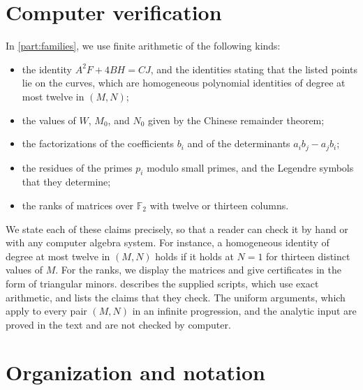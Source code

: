 \documentclass[12pt,oneside,openany]{book}
\theoremstyle{definition}
\theoremstyle{plain}
\numberwithin{equation}{chapter}
\theoremstyle{plain}
\theoremstyle{definition}
\theoremstyle{remark}
\newcommand{\F}{\mathbb F}
\begin{document}
\section{Computer verification}\label{sec:intro-verification}

In \cref{part:families}, we use finite arithmetic of the following kinds:
\begin{itemize}
\item the identity $A^2F+4BH=CJ$, and the identities stating that the listed points lie on the curves, which are homogeneous polynomial identities of degree at most twelve in $(M,N)$;
\item the values of $W$, $M_0$, and $N_0$ given by the Chinese remainder theorem;
\item the factorizations of the coefficients $b_i$ and of the determinants $a_ib_j-a_jb_i$;
\item the residues of the primes $p_i$ modulo small primes, and the Legendre symbols that they determine;
\item the ranks of matrices over $\F_2$ with twelve or thirteen columns.
\end{itemize}
We state each of these claims precisely, so that a reader can check it by hand or with any computer algebra system. For instance, a homogeneous identity of degree at most twelve in $(M,N)$ holds if it holds at $N=1$ for thirteen distinct values of $M$. For the ranks, we display the matrices and give certificates in the form of triangular minors.  describes the supplied scripts, which use exact arithmetic, and lists the claims that they check. The uniform arguments, which apply to every pair $(M,N)$ in an infinite progression, and the analytic input are proved in the text and are not checked by computer.

\section{Organization and notation}\label{sec:intro-organization}
\end{document}
